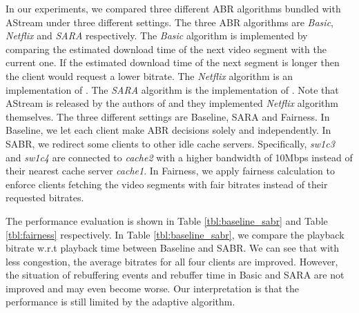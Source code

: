 \documentclass[12pt]{article}
\begin{document}
In our experiments, we compared three different ABR algorithms bundled with AStream under three different settings. The three ABR algorithms are \textit{Basic}, \textit{Netflix} and \textit{SARA} respectively. The \textit{Basic} algorithm is implemented by comparing the estimated download time of the next video segment with the current one. If the estimated download time of the next segment is longer then the client would request a lower bitrate. The \textit{Netflix} algorithm is an implementation of \cite{tyhuang}. The \textit{SARA} algorithm is the implementation of \cite{sara}. Note that AStream is released by the authors of \cite{sara} and they implemented \textit{Netflix} algorithm themselves. The three different settings are Baseline, SARA and Fairness. In Baseline, we let each client make ABR decisions solely and independently. In SABR, we redirect some clients to other idle cache servers. Specifically, \textit{sw1c3} and \textit{sw1c4} are connected to \textit{cache2} with a higher bandwidth of 10Mbps instead of their nearest cache server \textit{cache1}. In Fairness, we apply fairness calculation to enforce clients fetching the video segments with fair bitrates instead of their requested bitrates.

The performance evaluation is shown in Table \ref{tbl:baseline_sabr} and Table \ref{tbl:fairness} respectively. In Table \ref{tbl:baseline_sabr}, we compare the playback bitrate w.r.t playback time between Baseline and SABR. We can see that with less congestion, the average bitrates for all four clients are improved. However, the situation of rebuffering events and rebuffer time in Basic and SARA are not improved and may even become worse. Our interpretation is that the performance is still limited by the adaptive algorithm. 
\end{document}
